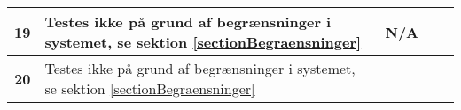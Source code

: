 \begin{center}
\begin{longtable}{|p{}|p{}|p{}|p{}|p{}|}
\textbf{19} &
Testes ikke på grund af begrænsninger i systemet, se sektion \ref{sectionBegraensninger}&
N/A &
 &
 \\\hline

\textbf{20} &
Testes ikke på grund af begrænsninger i systemet, se sektion \ref{sectionBegraensninger}&
&
 &
 \\\hline



	\end{longtable}
	\label{IKFUNK} 
\end{center}